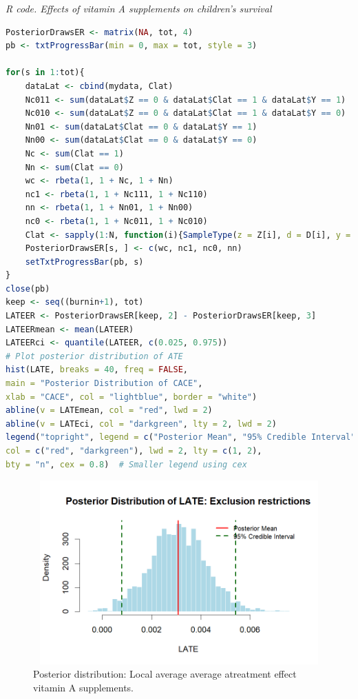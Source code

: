 \begin{tcolorbox}[enhanced,width=4.67in,center upper,
	fontupper=\large\bfseries,drop shadow southwest,sharp corners]
	\textit{R code. Effects of vitamin A supplements on children's survival}
	\begin{VF}
		\begin{lstlisting}[language=R]
PosteriorDrawsER <- matrix(NA, tot, 4)
pb <- txtProgressBar(min = 0, max = tot, style = 3)

for(s in 1:tot){
	dataLat <- cbind(mydata, Clat)
	Nc011 <- sum(dataLat$Z == 0 & dataLat$Clat == 1 & dataLat$Y == 1)
	Nc010 <- sum(dataLat$Z == 0 & dataLat$Clat == 1 & dataLat$Y == 0)
	Nn01 <- sum(dataLat$Clat == 0 & dataLat$Y == 1)
	Nn00 <- sum(dataLat$Clat == 0 & dataLat$Y == 0)
	Nc <- sum(Clat == 1)
	Nn <- sum(Clat == 0)
	wc <- rbeta(1, 1 + Nc, 1 + Nn)
	nc1 <- rbeta(1, 1 + Nc111, 1 + Nc110)
	nn <- rbeta(1, 1 + Nn01, 1 + Nn00)
	nc0 <- rbeta(1, 1 + Nc011, 1 + Nc010)
	Clat <- sapply(1:N, function(i){SampleType(z = Z[i], d = D[i], y = Y[i], wc = wc, nc0 = nc0, nn0 = nn)})
	PosteriorDrawsER[s, ] <- c(wc, nc1, nc0, nn)
	setTxtProgressBar(pb, s)
}
close(pb)
keep <- seq((burnin+1), tot)
LATEER <- PosteriorDrawsER[keep, 2] - PosteriorDrawsER[keep, 3]
LATEERmean <- mean(LATEER)
LATEERci <- quantile(LATEER, c(0.025, 0.975))
# Plot posterior distribution of ATE
hist(LATE, breaks = 40, freq = FALSE,
main = "Posterior Distribution of CACE",
xlab = "CACE", col = "lightblue", border = "white")
abline(v = LATEmean, col = "red", lwd = 2)
abline(v = LATEci, col = "darkgreen", lty = 2, lwd = 2)
legend("topright", legend = c("Posterior Mean", "95% Credible Interval"),
col = c("red", "darkgreen"), lwd = 2, lty = c(1, 2),
bty = "n", cex = 0.8)  # Smaller legend using cex
\end{lstlisting}
	\end{VF}
\end{tcolorbox} 

\begin{figure}[h!]
	\includegraphics[width=340pt, height=200pt]{Chapters/chapter12/figures/LATE.png}
	\caption[List of figure caption goes here]{Posterior distribution: Local average average atreatment effect vitamin A supplements.}\label{fig12_LATE}
\end{figure}


